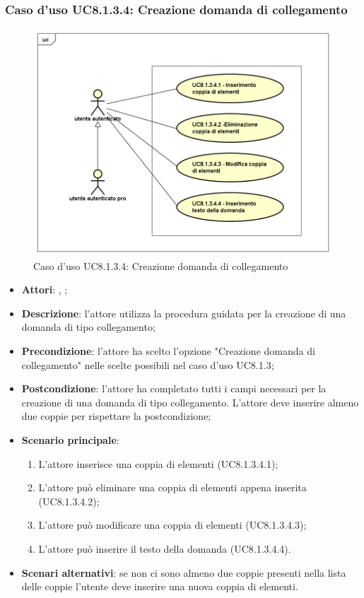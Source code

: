 \subsubsection{Caso d'uso UC8.1.3.4: Creazione domanda di collegamento}
\label{UC8.1.3.4}
\begin{figure}[h]
	\centering
\includegraphics[scale=0.5,keepaspectratio]{UML/UC8_1_3_4.png}
	\caption{Caso d'uso UC8.1.3.4: Creazione domanda di collegamento}
\end{figure}
\FloatBarrier
\begin{itemize}
	\item \textbf{Attori}: \uau, \uaupro;
	\item \textbf{Descrizione}: l'attore utilizza la procedura guidata per la creazione di una domanda di tipo collegamento; 
	\item \textbf{Precondizione}: l'attore ha scelto l'opzione "Creazione domanda di collegamento" nelle scelte possibili nel caso d'uso UC8.1.3;
	\item \textbf{Postcondizione}: l'attore ha completato tutti i campi necessari per la creazione di una domanda di tipo collegamento. L'attore deve inserire almeno due coppie per rispettare la postcondizione;
	\item \textbf{Scenario principale}: 
		\begin{enumerate}
			\item L'attore inserisce una coppia di elementi (UC8.1.3.4.1);
			\item L'attore può eliminare una coppia di elementi appena inserita (UC8.1.3.4.2);
			\item L'attore può modificare una coppia di elementi (UC8.1.3.4.3);
			\item L'attore può inserire il testo della domanda (UC8.1.3.4.4).
		\end{enumerate}
	\item \textbf{Scenari alternativi}: se non ci sono almeno due coppie presenti nella lista delle coppie l'utente deve inserire una nuova coppia di elementi.
\end{itemize}

